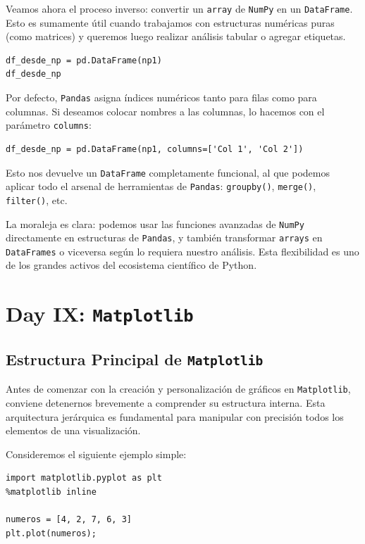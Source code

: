 \documentclass{article}
\theoremstyle{nonumberplain}
\begin{document}
Veamos ahora el proceso inverso: convertir un \texttt{array} de \texttt{NumPy} en un \texttt{DataFrame}. Esto es sumamente útil cuando trabajamos con estructuras numéricas puras (como matrices) y queremos luego realizar análisis tabular o agregar etiquetas.

\begin{verbatim}
df_desde_np = pd.DataFrame(np1)
df_desde_np
\end{verbatim}

Por defecto, \texttt{Pandas} asigna índices numéricos tanto para filas como para columnas. Si deseamos colocar nombres a las columnas, lo hacemos con el parámetro \texttt{columns}:

\begin{verbatim}
df_desde_np = pd.DataFrame(np1, columns=['Col 1', 'Col 2'])
\end{verbatim}

Esto nos devuelve un \texttt{DataFrame} completamente funcional, al que podemos aplicar todo el arsenal de herramientas de \texttt{Pandas}: \texttt{groupby()}, \texttt{merge()}, \texttt{filter()}, etc.

La moraleja es clara: podemos usar las funciones avanzadas de \texttt{NumPy} directamente en estructuras de \texttt{Pandas}, y también transformar \texttt{arrays} en \texttt{DataFrames} o viceversa según lo requiera nuestro análisis. Esta flexibilidad es uno de los grandes activos del ecosistema científico de Python.

\section*{Day IX: \texttt{Matplotlib}}

\subsection*{Estructura Principal de \texttt{Matplotlib}}

Antes de comenzar con la creación y personalización de gráficos en \texttt{Matplotlib}, conviene detenernos brevemente a comprender su estructura interna. Esta arquitectura jerárquica es fundamental para manipular con precisión todos los elementos de una visualización.

Consideremos el siguiente ejemplo simple:

\begin{verbatim}
import matplotlib.pyplot as plt
%matplotlib inline

numeros = [4, 2, 7, 6, 3]
plt.plot(numeros);
\end{verbatim}
\end{document}
